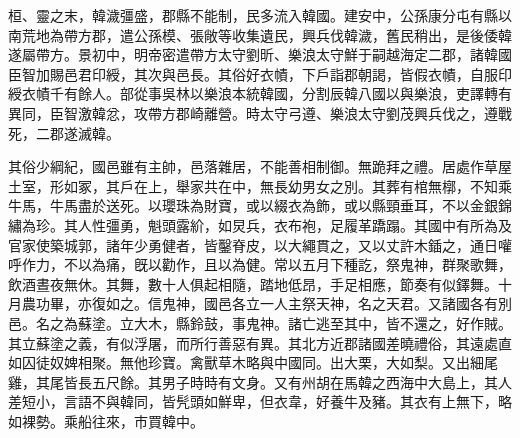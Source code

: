 \begin{pinyinscope}
桓、靈之末，韓濊彊盛，郡縣不能制，民多流入韓國。建安中，公孫康分屯有縣以南荒地為帶方郡，遣公孫模、張敞等收集遺民，興兵伐韓濊，舊民稍出，是後倭韓遂屬帶方。景初中，明帝密遣帶方太守劉昕、樂浪太守鮮于嗣越海定二郡，諸韓國臣智加賜邑君印綬，其次與邑長。其俗好衣幘，下戶詣郡朝謁，皆假衣幘，自服印綬衣幘千有餘人。部從事吳林以樂浪本統韓國，分割辰韓八國以與樂浪，吏譯轉有異同，臣智激韓忿，攻帶方郡崎離營。時太守弓遵、樂浪太守劉茂興兵伐之，遵戰死，二郡遂滅韓。

其俗少綱紀，國邑雖有主帥，邑落雜居，不能善相制御。無跪拜之禮。居處作草屋土室，形如冢，其戶在上，舉家共在中，無長幼男女之別。其葬有棺無槨，不知乘牛馬，牛馬盡於送死。以瓔珠為財寶，或以綴衣為飾，或以縣頸垂耳，不以金銀錦繡為珍。其人性彊勇，魁頭露紒，如炅兵，衣布袍，足履革蹻蹋。其國中有所為及官家使築城郭，諸年少勇健者，皆鑿脊皮，以大繩貫之，又以丈許木鍤之，通日嚾呼作力，不以為痛，旣以勸作，且以為健。常以五月下種訖，祭鬼神，群聚歌舞，飲酒晝夜無休。其舞，數十人俱起相隨，踏地低昂，手足相應，節奏有似鐸舞。十月農功畢，亦復如之。信鬼神，國邑各立一人主祭天神，名之天君。又諸國各有別邑。名之為蘇塗。立大木，縣鈴鼓，事鬼神。諸亡逃至其中，皆不還之，好作賊。其立蘇塗之義，有似浮屠，而所行善惡有異。其北方近郡諸國差曉禮俗，其遠處直如囚徒奴婢相聚。無他珍寶。禽獸草木略與中國同。出大栗，大如梨。又出細尾雞，其尾皆長五尺餘。其男子時時有文身。又有州胡在馬韓之西海中大島上，其人差短小，言語不與韓同，皆髠頭如鮮卑，但衣韋，好養牛及豬。其衣有上無下，略如裸勢。乘船往來，巿買韓中。


\end{pinyinscope}